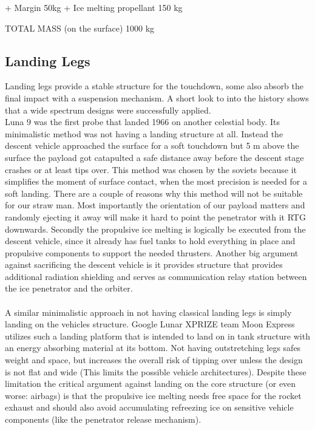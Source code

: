 + Margin 50kg
+ Ice melting propellant 150 kg

TOTAL MASS (on the surface) 1000 kg





\subsection{Landing Legs}
Landing legs provide a stable structure for the touchdown, some also absorb the final impact with a suspension mechanism. A short look to into the history shows that a wide spectrum designs were successfully applied.\\
 Luna 9 was the first probe that landed 1966 on another celestial body. Its minimalistic method was not having a landing structure at all. Instead the descent vehicle approached the surface for a soft touchdown but 5 m above the surface the payload got catapulted a safe distance away before the descent stage crashes or at least tips over. This method was chosen by the soviets because it simplifies the moment of surface contact, when the most precision is needed for a soft landing. There are a couple of reasons why this method will not be suitable for our straw man. Most importantly the orientation of our payload matters and randomly ejecting it away will make it hard to point the penetrator with it RTG downwards. Secondly the propulsive ice melting is logically be executed from the descent vehicle, since it already has fuel tanks to hold everything in place and propulsive components to support the needed thrusters.  Another big argument against sacrificing the descent vehicle is it provides structure that provides additional radiation shielding and serves as communication relay station between the ice penetrator and the orbiter.\\
\\
A similar minimalistic approach in not having classical landing legs is simply landing on the vehicles structure. Google Lunar XPRIZE team Moon Express utilizes such a landing platform that is intended to land on in tank structure with an energy absorbing material at its bottom. Not having outstretching legs safes weight and space, but increases the overall risk of tipping over unless the design is not flat and wide (This limits the possible vehicle architectures). Despite these limitation the critical argument against landing on the core structure (or even worse: airbags) is that the propulsive ice melting needs free space for the rocket exhaust and should also avoid accumulating refreezing ice on sensitive vehicle components (like the penetrator release mechanism).\\
